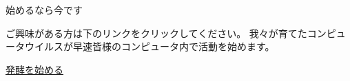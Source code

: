 \documentclass[12pt, unicode]{beamer}
\begin{document}
\begin{frame}{始めるなら今です}

ご興味がある方は下のリンクをクリックしてください。
我々が育てたコンピュータウイルスが早速皆様のコンピュータ内で活動を始めます。

\vspace{2\baselineskip}

{\color{blue}
\href{https://github.com/tannakaken/DataFermentation/releases/download/1.0.1/main.pdf}{\underline{発酵を始める}}
}

\end{frame}
\end{document}
